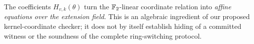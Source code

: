 \begin{remark}
The coefficients $H_{v,k}(\theta)$ turn the
$\mathbb{F}_2$-linear coordinate relation into \emph{affine equations
over the extension field}. This is an algebraic ingredient
of our proposed kernel-coordinate checker; it does not
by itself establish hiding of a committed witness or
the soundness of the complete ring-switching protocol.
\end{remark}
